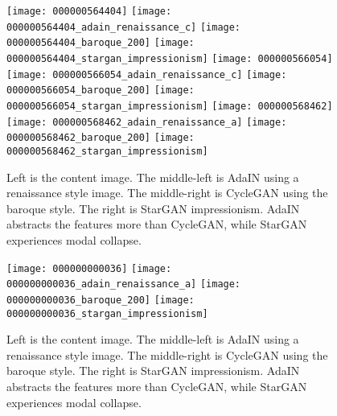 \begin{figure}[h]
	\centering
	{%
        \texttt{[image: 000000564404]}
        \texttt{[image: 000000564404\_adain\_renaissance\_c]}
        \texttt{[image: 000000564404\_baroque\_200]}
        \texttt{[image: 000000564404\_stargan\_impressionism]}
	}
	{%
        \texttt{[image: 000000566054]}
        \texttt{[image: 000000566054\_adain\_renaissance\_c]}
        \texttt{[image: 000000566054\_baroque\_200]}
        \texttt{[image: 000000566054\_stargan\_impressionism]}
	}
	{%
        \texttt{[image: 000000568462]}
        \texttt{[image: 000000568462\_adain\_renaissance\_a]}
        \texttt{[image: 000000568462\_baroque\_200]}
        \texttt{[image: 000000568462\_stargan\_impressionism]}
	}
	\caption{Left is the content image. The middle-left is AdaIN using a renaissance style image. The middle-right is CycleGAN using the baroque style. The right is StarGAN impressionism. AdaIN abstracts the features more than CycleGAN, while StarGAN experiences modal collapse.}
	\label{fig:difference_AdaIN_CycleGAN}
\end{figure}

\begin{figure}[h]
	\centering
	{%
        \texttt{[image: 000000000036]}
        \texttt{[image: 000000000036\_adain\_renaissance\_a]}
        \texttt{[image: 000000000036\_baroque\_200]}
        \texttt{[image: 000000000036\_stargan\_impressionism]}
    }
	\caption{Left is the content image. The middle-left is AdaIN using a renaissance style image. The middle-right is CycleGAN using the baroque style. The right is StarGAN impressionism. AdaIN abstracts the features more than CycleGAN, while StarGAN experiences modal collapse.}
	\label{fig:difference_AdaIN_CycleGAN_2}
\end{figure}

